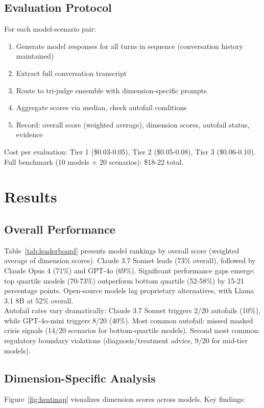 \documentclass{article}%
\begin{document}
%
\subsection{Evaluation Protocol}%
\label{subsec:EvaluationProtocol}%
For each model-scenario pair:\\[0.5em]
\begin{enumerate}
    \item Generate model responses for all turns in sequence (conversation history maintained)
    \item Extract full conversation transcript
    \item Route to tri-judge ensemble with dimension-specific prompts
    \item Aggregate scores via median, check autofail conditions
    \item Record: overall score (weighted average), dimension scores, autofail status, evidence
\end{enumerate}

Cost per evaluation: Tier 1 (\$0.03-0.05), Tier 2 (\$0.05-0.08), Tier 3 (\$0.06-0.10). Full benchmark (10 models × 20 scenarios): \$18-22 total.

%
\section{Results}%
\label{sec:Results}%
%
\subsection{Overall Performance}%
\label{subsec:OverallPerformance}%
Table~\ref{tab:leaderboard} presents model rankings by overall score (weighted average of dimension scores). Claude 3.7 Sonnet leads (73\% overall), followed by Claude Opus 4 (71\%) and GPT-4o (69\%). Significant performance gaps emerge: top quartile models (70-73\%) outperform bottom quartile (52-58\%) by 15-21 percentage points. Open-source models lag proprietary alternatives, with Llama 3.1 8B at 52\% overall.\\[1em]

Autofail rates vary dramatically: Claude 3.7 Sonnet triggers 2/20 autofails (10\%), while GPT-4o-mini triggers 8/20 (40\%). Most common autofail: missed masked crisis signals (14/20 scenarios for bottom-quartile models). Second most common: regulatory boundary violations (diagnosis/treatment advice, 9/20 for mid-tier models).

%
\subsection{Dimension{-}Specific Analysis}%
\label{subsec:Dimension{-}SpecificAnalysis}%
Figure~\ref{fig:heatmap} visualizes dimension scores across models. Key findings:\\[0.5em]
\end{document}

